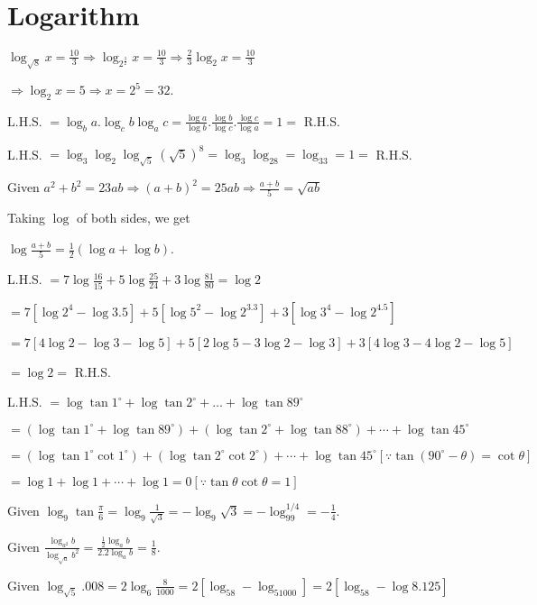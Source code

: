 \chapter{Logarithm}
\startitemize[n, 2*broad]
\item $\log_{\sqrt{8}}x = \frac{10}{3} \Rightarrow \log_{2^{\tfrac{3}{2}}}x = \frac{10}{3}\Rightarrow \frac{2}{3}\log_2x = \frac{10}{3}$

  $\Rightarrow \log_2x = 5 \Rightarrow x = 2^5 = 32.$
\item L.H.S. $= \log_ba.\log_cb\log_ac = \frac{\log a}{\log b}.\frac{\log b}{\log c}.\frac{\log c}{\log a} = 1 =$ R.H.S.
\item L.H.S. $= \log_3\log_2\log_{\sqrt{5}}(\sqrt{5})^8 = \log_3\log_28 = \log_33 = 1 =$ R.H.S.
\item Given $a^2 + b^2 = 23ab \Rightarrow (a + b)^2 = 25ab \Rightarrow \frac{a + b}{5} = \sqrt{ab}$

  Taking $\log$ of both sides, we get

  $\log\frac{a + b}{5} = \frac{1}{2}(\log a + \log b)$.
\item L.H.S. $= 7\log\frac{16}{15} + 5\log\frac{25}{24} + 3\log\frac{81}{80} = \log 2$

  $= 7[\log 2^4 - \log 3.5] + 5[\log 5^2 - \log 2^3.3] + 3[\log 3^4 - \log 2^4.5]$

  $= 7[4\log 2 - \log 3 - \log 5] + 5[2\log 5 - 3\log 2 - \log 3] + 3[4\log 3 - 4\log 2 - \log 5]$

  $= \log 2 =$ R.H.S.
\item L.H.S. $= \log\tan1^\circ + \log\tan2^\circ + \ldots + \log\tan89^\circ$

  $= (\log\tan1^\circ + \log\tan89^\circ) + (\log\tan2^\circ + \log\tan88^\circ) + \cdots + \log\tan45^\circ$

  $=(\log\tan1^\circ\cot1^\circ) + (\log\tan2^\circ\cot2^\circ) + \cdots + \log\tan45^\circ [\because \tan(90^\circ - \theta) =
  \cot\theta]$

  $= \log 1 + \log 1 + \cdots + \log 1 = 0 [\because \tan\theta\cot\theta = 1]$
\item Given $\log_9\tan\frac{\pi}{6} = \log_9\frac{1}{\sqrt{3}} = -\log_9\sqrt{3} = -\log_99^{1/4} = -\frac{1}{4}$.
\item Given $\frac{\log_{a^2}b}{\log_{\sqrt{a}}b^2} = \frac{\frac{1}{2}\log_ab}{2.2\log_ab} = \frac{1}{8}$.
\item Given $\log_{\sqrt{5}}.008 = 2\log_6\frac{8}{1000} = 2[\log_58 - \log_51000] = 2[\log_58 - \log 8.125]$

